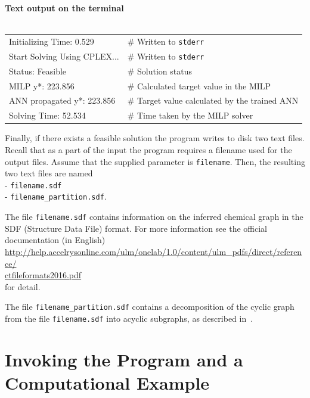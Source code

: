 \documentclass[11pt,titlepage,dvipdfmx,twoside]{book}
\begin{document}
\begin{oframed}
{\bf Text output on the terminal}\\\\
\begin{tabular}{l l}
 Initializing Time: 0.529                &         \# Written to {\tt stderr} \\
Start Solving Using CPLEX...      &       \# Written to {\tt stderr} \\
Status: Feasible 				&       \# Solution status \\
MILP y*: 223.856 				&      \# Calculated target value in the MILP  \\
ANN propagated y*: 223.856     &      \# Target value calculated by the trained ANN  \\
Solving Time: 52.534                     &      \# Time taken by the MILP solver \\
\end{tabular}



\end{oframed}

Finally, if there exists a feasible solution the program writes to disk two text files.
Recall that as a part of the input the program requires a filename
used for the output files. 
Assume that the supplied parameter is {\tt filename}.
Then, the resulting two text files are named \\
- {\tt filename.sdf} \\
- {\tt filename\_partition.sdf}. 

\noindent
The file {\tt filename.sdf} contains information
on the inferred chemical graph in the SDF (Structure Data File)
format.
For more information see the official documentation (in English) \\
\url{http://help.accelrysonline.com/ulm/onelab/1.0/content/ulm_pdfs/direct/reference/}\\
 \url{ctfileformats2016.pdf} \\
for detail.

\noindent
The file {\tt filename\_partition.sdf} contains a 
decomposition of the cyclic graph from the 
file {\tt filename.sdf} into acyclic subgraphs,
as described in~\cite{AN20}.



\section{Invoking the Program and a Computational Example}
\label{chap:Exp}
\end{document}
